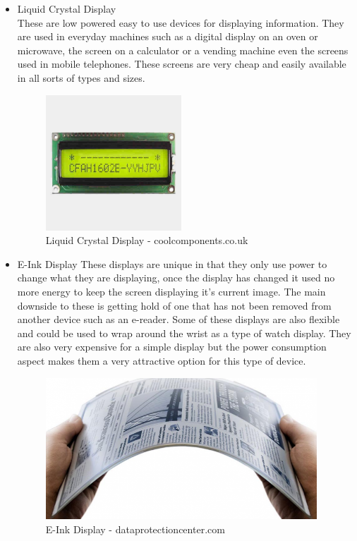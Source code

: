 \begin{itemize}
\item Liquid Crystal Display
\\These are low powered easy to use devices for displaying information.  They are used in everyday machines such as a digital display on an oven or microwave, the screen on a calculator or a vending machine even the screens used in mobile telephones.  These screens are very cheap and easily available in all sorts of types and sizes.
\begin{figure}[h]
\centering
        \includegraphics[width=2.0in] {Images/lcd.jpg}
        \caption{Liquid Crystal Display - coolcomponents.co.uk}
        \label{Liquid Crystal Display}
\end{figure}
\item E-Ink Display
These displays are unique in that they only use power to change what they are displaying, once the display has changed it used no more energy to keep the screen displaying it's current image.  The main downside to these is getting hold of one that has not been removed from another device such as an e-reader.  Some of these displays are also flexible and could be used to wrap around the wrist as a type of watch display.  They are also very expensive for a simple display but the power consumption aspect makes them a very attractive option for this type of device.
\begin{figure}[h]
\centering
        \includegraphics[width=4.0in] {Images/e-ink-display.png}
        \caption{E-Ink Display - dataprotectioncenter.com}
        \label{E-Ink Display}
\end{figure}
\end{itemize}
